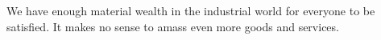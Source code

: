 We have enough material wealth in the industrial world for everyone to be satisfied.
It makes no sense to amass even more goods and services.